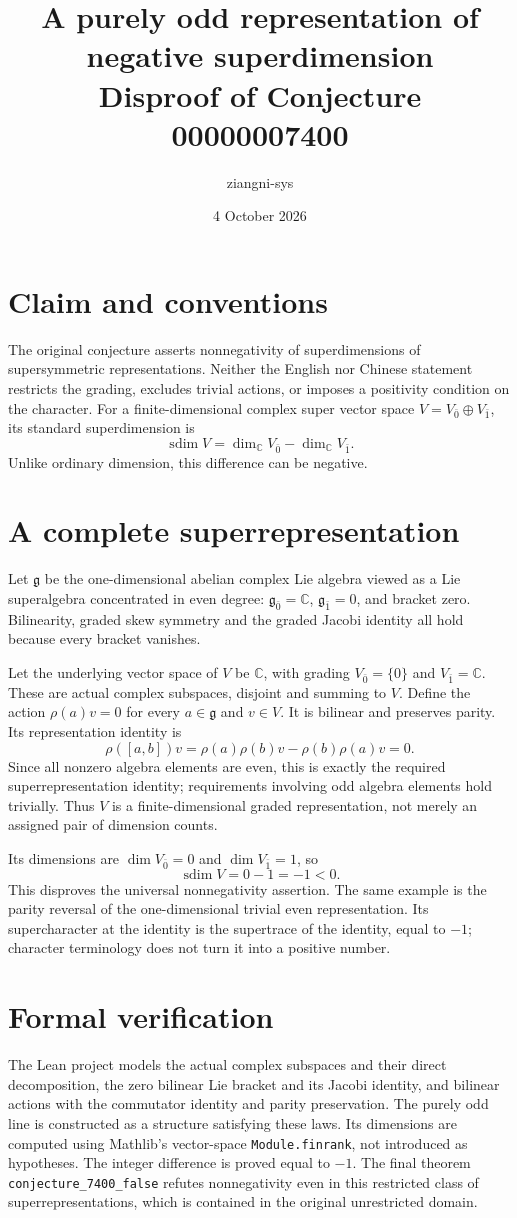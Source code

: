 \documentclass[10pt]{article}
\title{A purely odd representation of negative superdimension\\Disproof of Conjecture 00000007400}
\author{ziangni-sys}
\date{4 October 2026}
\begin{document}
\maketitle
\section*{Claim and conventions}
The original conjecture asserts nonnegativity of superdimensions of
supersymmetric representations. Neither the English nor Chinese statement
restricts the grading, excludes trivial actions, or imposes a positivity
condition on the character.
For a finite-dimensional complex super vector space
$V=V_{\bar0}\oplus V_{\bar1}$, its standard superdimension is
\[
\operatorname{sdim}V=\dim_{\mathbb C}V_{\bar0}
-\dim_{\mathbb C}V_{\bar1}.
\]
Unlike ordinary dimension, this difference can be negative.

\section*{A complete superrepresentation}
Let $\mathfrak g$ be the one-dimensional abelian complex Lie algebra
viewed as a Lie superalgebra concentrated in even degree:
$\mathfrak g_{\bar0}=\mathbb C$, $\mathfrak g_{\bar1}=0$, and bracket zero.
Bilinearity, graded skew symmetry and the graded Jacobi identity all hold
because every bracket vanishes.

Let the underlying vector space of $V$ be $\mathbb C$, with grading
$V_{\bar0}=\{0\}$ and $V_{\bar1}=\mathbb C$.
These are actual complex subspaces, disjoint and summing to $V$.
Define the action $\rho(a)v=0$ for every $a\in\mathfrak g$ and $v\in V$.
It is bilinear and preserves parity. Its representation identity is
\[
\rho([a,b])v
=\rho(a)\rho(b)v-\rho(b)\rho(a)v=0.
\]
Since all nonzero algebra elements are even, this is exactly the required
superrepresentation identity; requirements involving odd algebra elements
hold trivially.
Thus $V$ is a finite-dimensional graded representation, not merely an
assigned pair of dimension counts.

Its dimensions are $\dim V_{\bar0}=0$ and $\dim V_{\bar1}=1$, so
\[
\operatorname{sdim}V=0-1=-1<0.
\]
This disproves the universal nonnegativity assertion.
The same example is the parity reversal of the one-dimensional trivial
even representation.
Its supercharacter at the identity is the supertrace of the identity,
equal to $-1$; character terminology does not turn it into a positive
number.

\section*{Formal verification}
The Lean project models the actual complex subspaces and their direct
decomposition, the zero bilinear Lie bracket and its Jacobi identity,
and bilinear actions with the commutator identity and parity preservation.
The purely odd line is constructed as a structure satisfying these laws.
Its dimensions are computed using Mathlib's vector-space
\texttt{Module.finrank}, not introduced as hypotheses.
The integer difference is proved equal to $-1$.
The final theorem \texttt{conjecture\_7400\_false} refutes nonnegativity
even in this restricted class of superrepresentations, which is contained
in the original unrestricted domain.
\end{document}
